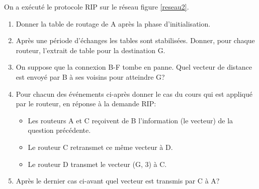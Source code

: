 \documentclass[a4paper,11pt]{article}
\begin{document}
\begin{exo}
\begin{center}
        \label{reseau2}
    \end{center}
    On a exécuté le protocole RIP sur le réseau figure \ref{reseau2}.
    \begin{enumerate}
        \item Donner la table de routage de A après la phase d'initialisation.
        \item Après une période d'échanges les tables sont stabilisées. Donner, pour chaque routeur, l'extrait de table pour la destination G.
        \item On suppose que la connexion B-F tombe en panne. Quel vecteur de distance est envoyé par B à ses voisins pour atteindre G?
        \item Pour chacun des événements ci-après donner le cas du cours qui est appliqué par le routeur, en réponse à la demande RIP:
              \begin{itemize}
                  \item Les routeurs A et C reçoivent de B l'information (le vecteur) de la question précédente.
                  \item Le routeur C retransmet ce même vecteur à D.
                  \item Le routeur D transmet le vecteur (G, 3) à C.
              \end{itemize}
        \item Après le dernier cas ci-avant quel vecteur est transmis par C à A?
    \end{enumerate}
\end{exo}
\end{document}
